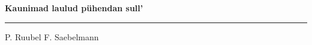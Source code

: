 \documentclass[10pt]{book}
\begin{document}
{
  \samepage
  \raggedbottom
  \raggedright
  \sloppy


  \vspace{0.2in}

  \noindent\begin{minipage}{.1\textwidth}
    \hfill\vspace{0.1in}
  \end{minipage}%
  \noindent\begin{minipage}{.8\textwidth}
    \centering
    \bfseries
    \large Kaunimad laulud p\"uhendan sull'
  \end{minipage}%
  \noindent\begin{minipage}{.1\textwidth}
      \hfill\vspace{0.1in}
  \end{minipage}

  \nopagebreak[4]
  \vspace{0.1in}
  \nopagebreak[4]
  \hrule height 0.05ex
  \nopagebreak[4]
  \vspace{-0.05in}

  {\footnotesize P. Ruubel \hfill F. Saebelmann }\\
  \vspace{0.01in}



}
\end{document}
